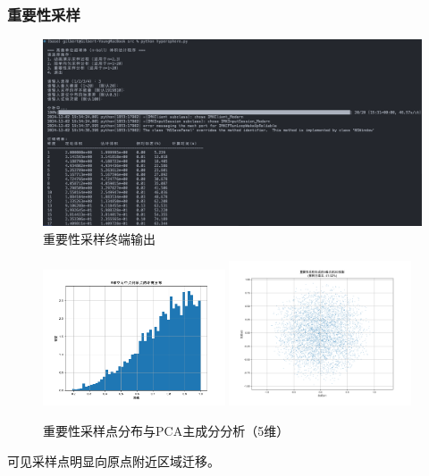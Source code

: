 \subsubsection{重要性采样}
\begin{figure}[H]
    \centering
    \includegraphics[width=1.0\textwidth]{Problem_1/figs/important_terminal.png}
    \caption{重要性采样终端输出}
\end{figure}

\begin{figure}[H]
    \centering
    \includegraphics[width=0.48\textwidth]{Problem_1/figs/important_5d_dis.png}
    \includegraphics[width=0.48\textwidth]{Problem_1/figs/important_5d_pca.png}
    \caption{重要性采样点分布与PCA主成分分析（5维）}
\end{figure}
可见采样点明显向原点附近区域迁移。

